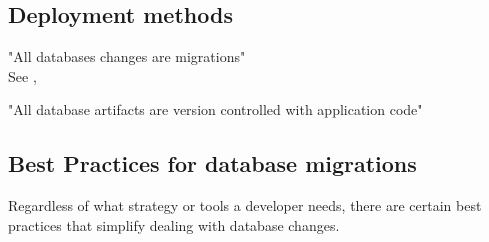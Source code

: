 \subsection{Deployment methods}
"All databases changes are migrations" \cite{Robles2021}\\
See \cite{Piairo2018}, \cite{Sadalage2016}

%
"All database artifacts are version controlled with application code"

%

%


\subsection{Best Practices for database migrations}%
%

Regardless of what strategy or tools a developer needs, there are certain best practices that simplify dealing with database changes.

